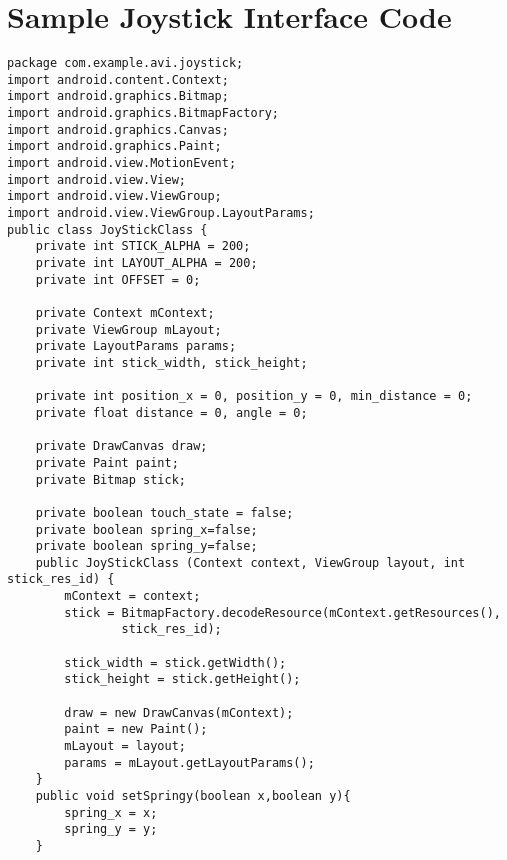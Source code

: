 \section{Sample Joystick Interface Code}
\begin{lstlisting}
package com.example.avi.joystick;
import android.content.Context;
import android.graphics.Bitmap;
import android.graphics.BitmapFactory;
import android.graphics.Canvas;
import android.graphics.Paint;
import android.view.MotionEvent;
import android.view.View;
import android.view.ViewGroup;
import android.view.ViewGroup.LayoutParams;
public class JoyStickClass {
    private int STICK_ALPHA = 200;
    private int LAYOUT_ALPHA = 200;
    private int OFFSET = 0;
    
    private Context mContext;
    private ViewGroup mLayout;
    private LayoutParams params;
    private int stick_width, stick_height;
    
    private int position_x = 0, position_y = 0, min_distance = 0;
    private float distance = 0, angle = 0;
    
    private DrawCanvas draw;
    private Paint paint;
    private Bitmap stick;
    
    private boolean touch_state = false;
    private boolean spring_x=false;
    private boolean spring_y=false;
    public JoyStickClass (Context context, ViewGroup layout, int stick_res_id) {
        mContext = context;
        stick = BitmapFactory.decodeResource(mContext.getResources(),
                stick_res_id);
        
        stick_width = stick.getWidth();
        stick_height = stick.getHeight();
        
        draw = new DrawCanvas(mContext);
        paint = new Paint();
        mLayout = layout;
        params = mLayout.getLayoutParams();
    }
    public void setSpringy(boolean x,boolean y){
        spring_x = x;
        spring_y = y;
    }
    

\end{lstlisting}
